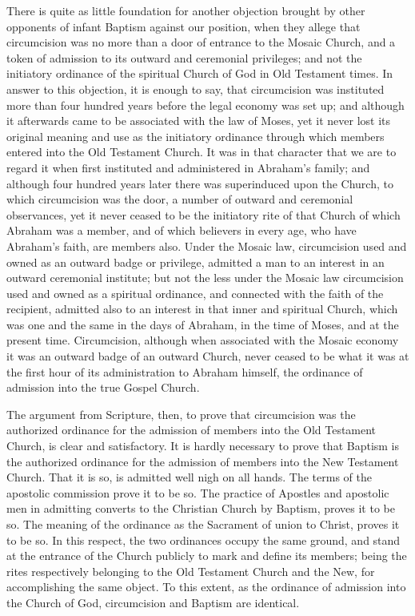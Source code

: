 \documentclass[english,]{book}
\begin{document}
There is quite as little foundation for another objection brought by other opponents of infant Baptism against our position, when they allege that circumcision was no more than a door of entrance to the Mosaic Church, and a token of admission to its outward and ceremonial privileges; and not the initiatory ordinance of the spiritual Church of God in Old Testament times. In answer to this objection, it is enough to say, that circumcision was instituted more than four hundred years before the legal economy was set up; and although it afterwards came to be associated with the law of Moses, yet it never lost its original meaning and use as the initiatory ordinance through which members entered into the Old Testament Church. It was in that character that we are to regard it when first instituted and administered in Abraham's family; and although four hundred years later there was superinduced upon the Church, to which circumcision was the door, a number of outward and ceremonial observances, yet it never ceased to be the initiatory rite of that Church of which Abraham was a member, and of which believers in every age, who have Abraham's faith, are members also. Under the Mosaic law, circumcision used and owned as an outward badge or privilege, admitted a man to an interest in an outward ceremonial institute; but not the less under the Mosaic law circumcision used and owned as a spiritual ordinance, and connected with the faith of the recipient, admitted also to an interest in that inner and spiritual Church, which was one and the same in the days of Abraham, in the time of Moses, and at the present time. Circumcision, although when associated with the Mosaic economy it was an outward badge of an outward Church, never ceased to be what it was at the first hour of its administration to Abraham himself, the ordinance of admission into the true Gospel Church.

The argument from Scripture, then, to prove that circumcision was the authorized ordinance for the admission of members into the Old Testament Church, is clear and satisfactory. It is hardly necessary to prove that Baptism is the authorized ordinance for the admission of members into the New Testament Church. That it is so, is admitted well nigh on all hands. The terms of the apostolic commission prove it to be so. The practice of Apostles and apostolic men in admitting converts to the Christian Church by Baptism, proves it to be so. The meaning of the ordinance as the Sacrament of union to Christ, proves it to be so. In this respect, the two ordinances occupy the same ground, and stand at the entrance of the Church publicly to mark and define its members; being the rites respectively belonging to the Old Testament Church and the New, for accomplishing the same object. To this extent, as the ordinance of admission into the Church of God, circumcision and Baptism are identical.
\end{document}
